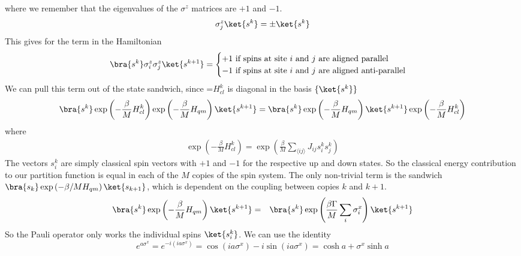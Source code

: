where we remember that the eigenvalues of the $\sigma^z$ matrices are $+1$ and $-1$.
\begin{equation*}
    \sigma^z_j \ket{s^k} = \pm  \ket{s^k}
\end{equation*}
This gives for the term in the Hamiltonian
\begin{equation*}
      \bra{s^k}\sigma^z_i \sigma^z_j  \ket{s^{k+1}} = \begin{cases}
      +1 \text{ if spins at site $i$ and $j$ are aligned parallel}\\
      -1 \text{ if spins at site $i$ and $j$ are aligned anti-parallel}
      \end{cases}
\end{equation*}
We can pull this term out of the state sandwich, since =$H_{cl}^k$ is diagonal in the basis $\{\ket{s^k}\}$
\begin{equation*}
    \bra{s^k} \exp\left(-\frac{\beta}{M}H_{cl}^k\right) \exp\left(-\frac{\beta}{M} H_{qm}\right) \ket{s^{k+1}} = \bra{s^k} \exp\left(-\frac{\beta}{M} H_{qm}\right) \ket{s^{k+1}} \exp\left(-\frac{\beta}{M}H_{cl}^k\right)
\end{equation*}
where 
\begin{eqnarray*}
    \exp\left(-\frac{\beta}{M} H_{cl}^k\right) = \exp\left(\frac{\beta}{M}\sum_{\langle ij \rangle} J_{ij} s_i^k s_j^k \right) 
\end{eqnarray*}
The vectors $s_i^k$ are simply classical spin vectors with $+1$ and $-1$ for the respective up and down states. So the classical energy contribution to our partition function is equal in each of the $M$ copies of the spin system. The only non-trivial term is the sandwich $\bra{s_k} \exp\left(-\beta/M H_{qm}\right) \ket{s_{k+1}}$, which is dependent on the coupling between copies $k$ and $k+1$.
\begin{eqnarray*}
    \bra{s^k} \exp\left(-\frac{\beta}{M} H_{qm}\right) \ket{s^{k+1}} &=& \bra{s^k} \exp\left(\frac{\beta\Gamma}{M} \sum_i \sigma_i^x\right) \ket{s^{k+1}}\\
\end{eqnarray*}
So the Pauli operator only works the individual spins $\ket{s^k_i}$. We can use the identity \cite{Das2014}
\begin{equation*}
    e^{a \sigma^x} = e^{-i (i a \sigma^x)} = \cos(i a \sigma^x) - i \sin(i a \sigma^x) = \cosh{a} + \sigma^x \sinh{a}
\end{equation*}
